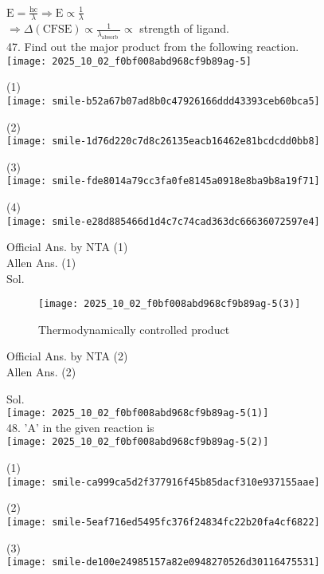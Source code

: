 \documentclass[10pt]{article}
\begin{document}
\(\mathrm{E}=\frac{\mathrm{hc}}{\lambda} \Rightarrow \mathrm{E} \propto \frac{1}{\lambda}\)\\
\(\Rightarrow \Delta(\mathrm{CFSE}) \propto \frac{1}{\lambda_{\text {absorb }}} \propto\) strength of ligand.\\
47. Find out the major product from the following reaction.\\
\texttt{[image: 2025\_10\_02\_f0bf008abd968cf9b89ag-5]}

(1)\\
\texttt{[image: smile-b52a67b07ad8b0c47926166ddd43393ceb60bca5]}

(2)\\
\texttt{[image: smile-1d76d220c7d8c26135eacb16462e81bcdcdd0bb8]}

(3)\\
\texttt{[image: smile-fde8014a79cc3fa0fe8145a0918e8ba9b8a19f71]}

(4)\\
\texttt{[image: smile-e28d885466d1d4c7c74cad363dc66636072597e4]}

Official Ans. by NTA (1)\\
Allen Ans. (1)\\
Sol.

\begin{figure}[h]
\begin{center}
  \texttt{[image: 2025\_10\_02\_f0bf008abd968cf9b89ag-5(3)]}
\captionsetup{labelformat=empty}
\caption{Thermodynamically controlled product}
\end{center}
\end{figure}

Official Ans. by NTA (2)\\
Allen Ans. (2)

Sol.\\
\texttt{[image: 2025\_10\_02\_f0bf008abd968cf9b89ag-5(1)]}\\
48. 'A' in the given reaction is\\
\texttt{[image: 2025\_10\_02\_f0bf008abd968cf9b89ag-5(2)]}

(1)\\
\texttt{[image: smile-ca999ca5d2f377916f45b85dacf310e937155aae]}

(2)\\
\texttt{[image: smile-5eaf716ed5495fc376f24834fc22b20fa4cf6822]}

(3)\\
\texttt{[image: smile-de100e24985157a82e0948270526d30116475531]}
\end{document}
